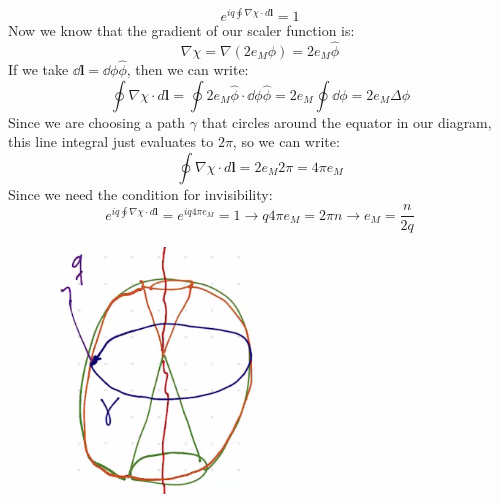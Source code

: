 \documentclass[12pt]{article}
\begin{document}
\begin{equation}
e^{i q \oint \nabla \chi \cdot d \boldsymbol{l}} = 1
\end{equation}
Now we know that the gradient of our scaler function is:
\begin{equation}
\nabla \chi = \nabla (2e_M \phi) = 2e_M \hat{\phi}
\end{equation}
If we take $\dd {\boldsymbol{l}} = \dd{\phi} \hat{\phi}$, then we can write:
\begin{equation}
\oint \nabla \chi \cdot d \boldsymbol{l} = \oint 2e_M \hat{\phi} \cdot \dd{\phi} \hat{\phi} = 2e_M \oint \dd{\phi} = 2e_M \Delta \phi
\end{equation}
Since we are choosing a path $\gamma $ that circles around the equator in our diagram, this line integral just evaluates to $2\pi$, so we can write:
\begin{equation}
\oint \nabla \chi \cdot d \boldsymbol{l} = 2e_M 2\pi = 4\pi e_M
\end{equation}
Since we need the condition for invisibility:
\begin{equation}
e^{i q \oint \nabla \chi \cdot d \boldsymbol{l}} = e^{i q 4\pi e_M} = 1 \rightarrow q 4\pi e_M = 2\pi n \rightarrow e_M = \frac{n}{2q}
\end{equation}
\begin{figure}
  \centering
  \includegraphics[width=0.5\textwidth]{dirac.png}
\end{figure}
\end{document}
